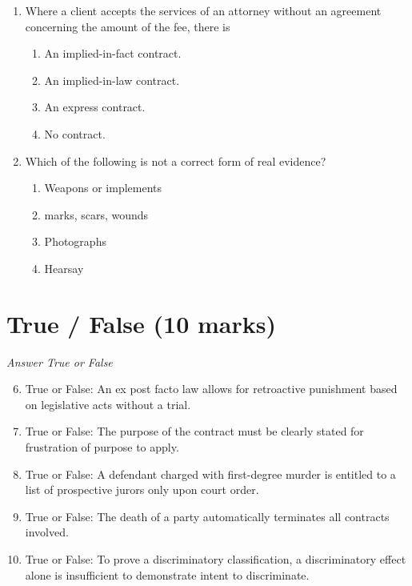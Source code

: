 \documentclass[12pt]{article}
\begin{document}
\begin{enumerate}[label=\arabic*.]
\begin{enumerate}[label=(\alph*)]
\end{enumerate}
\item Where a client accepts the services of an attorney without an agreement concerning the amount of the fee, there is
\begin{enumerate}[label=(\alph*)]
    \item An implied-in-fact contract.
    \item An implied-in-law contract.
    \item An express contract.
    \item No contract.
\end{enumerate}
\item Which of the following is not a correct form of real evidence?
\begin{enumerate}[label=(\alph*)]
    \item Weapons or implements
    \item marks, scars, wounds
    \item Photographs
    \item Hearsay
\end{enumerate}
\end{enumerate}

\section*{True / False (10 marks)}
\textit{Answer True or False}
\begin{enumerate}[label=\arabic*.]
\setcounter{enumi}{5}
\item True or False: An ex post facto law allows for retroactive punishment based on legislative acts without a trial.
\item True or False: The purpose of the contract must be clearly stated for frustration of purpose to apply.
\item True or False: A defendant charged with first-degree murder is entitled to a list of prospective jurors only upon court order.
\item True or False: The death of a party automatically terminates all contracts involved.
\item True or False: To prove a discriminatory classification, a discriminatory effect alone is insufficient to demonstrate intent to discriminate.
\end{enumerate}
\end{document}
